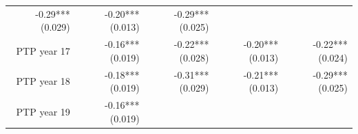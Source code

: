 \documentclass[]{article}
\begin{document}
\begin{longtable}[c]{@{}rrrrr@{}}
\begin{minipage}[t]{0.16\columnwidth}
-0.29*** (0.029)
\strut\end{minipage} &
\begin{minipage}[t]{0.18\columnwidth}\raggedleft\strut
-0.20*** (0.013)
\strut\end{minipage} &
\begin{minipage}[t]{0.15\columnwidth}\raggedleft\strut
-0.29*** (0.025)
\strut\end{minipage}\tabularnewline
\begin{minipage}[t]{0.17\columnwidth}\raggedleft\strut
PTP year 17
\strut\end{minipage} &
\begin{minipage}[t]{0.20\columnwidth}\raggedleft\strut
-0.16*** (0.019)
\strut\end{minipage} &
\begin{minipage}[t]{0.16\columnwidth}\raggedleft\strut
-0.22*** (0.028)
\strut\end{minipage} &
\begin{minipage}[t]{0.18\columnwidth}\raggedleft\strut
-0.20*** (0.013)
\strut\end{minipage} &
\begin{minipage}[t]{0.15\columnwidth}\raggedleft\strut
-0.22*** (0.024)
\strut\end{minipage}\tabularnewline
\begin{minipage}[t]{0.17\columnwidth}\raggedleft\strut
PTP year 18
\strut\end{minipage} &
\begin{minipage}[t]{0.20\columnwidth}\raggedleft\strut
-0.18*** (0.019)
\strut\end{minipage} &
\begin{minipage}[t]{0.16\columnwidth}\raggedleft\strut
-0.31*** (0.029)
\strut\end{minipage} &
\begin{minipage}[t]{0.18\columnwidth}\raggedleft\strut
-0.21*** (0.013)
\strut\end{minipage} &
\begin{minipage}[t]{0.15\columnwidth}\raggedleft\strut
-0.29*** (0.025)
\strut\end{minipage}\tabularnewline
\begin{minipage}[t]{0.17\columnwidth}\raggedleft\strut
PTP year 19
\strut\end{minipage} &
\begin{minipage}[t]{0.20\columnwidth}\raggedleft\strut
-0.16*** (0.019)
\strut\end{minipage} &
\begin{minipage}[t]{0.16\columnwidth}\raggedleft\strut

\end{minipage}
\end{longtable}
\end{document}
